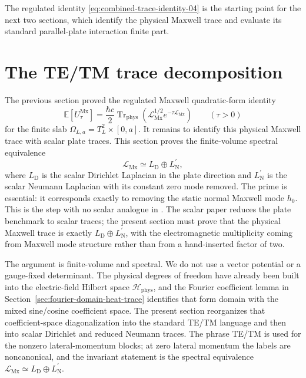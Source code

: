 \documentclass[11pt]{article}
\providecommand{\hbarc}{\hbar c}
\providecommand{\E}{\mathbb{E}}
\providecommand{\Trphys}{\operatorname{Tr}_{\mathrm{phys}}}
\providecommand{\paren}[1]{\left(#1\right)}
\providecommand{\OmegaLa}{\Omega_{L,a}}
\providecommand{\TtwoL}{T_L^2}
\providecommand{\Hphys}{\mathcal H_{\mathrm{phys}}}
\providecommand{\hzero}{h_0}
\providecommand{\LMx}{\mathcal L_{\mathrm{Mx}}}
\providecommand{\LD}{L_{\mathrm D}}
\providecommand{\LNp}{L_{\mathrm N}^{\prime}}
\providecommand{\UtauMx}{U_{\tau}^{\mathrm{Mx}}}
\numberwithin{equation}{section}
\begin{document}
\begin{remark}
\label{rem:remaining-after-riesz-gaussian}
The regulated identity \eqref{eq:combined-trace-identity-04} is the starting
point for the next two sections, which identify the physical Maxwell trace and
evaluate its standard parallel-plate interaction finite part.
\end{remark}
\section{The TE/TM trace decomposition}
\label{sec:te-tm-decomposition}

The previous section proved the regulated Maxwell quadratic-form identity
\begin{equation}
    \E[\UtauMx]
    =
    \frac{\hbarc}{2}
    \Trphys\paren{\LMx^{1/2}e^{-\tau\LMx}}
    \qquad (\tau>0)
    \label{eq:te-tm-starting-regulated-trace}
\end{equation}
for the finite slab \(\OmegaLa=\TtwoL\times[0,a]\).  It remains to identify
this physical Maxwell trace with scalar plate traces.  This section proves the
finite-volume spectral equivalence
\begin{equation}
    \LMx \simeq \LD\oplus \LNp,
    \label{eq:LMx-spectral-equivalence-LD-LNp-informal}
\end{equation}
where \(\LD\) is the scalar Dirichlet Laplacian in the plate direction and
\(\LNp\) is the scalar Neumann Laplacian with its constant zero mode removed.
The prime is essential: it corresponds exactly to removing the static normal
Maxwell mode \(\hzero\).
This is the step with no scalar analogue in \cite{KhanKhan2026Scalar}.  The
scalar paper reduces the plate benchmark to scalar traces; the present section
must prove that the physical Maxwell trace is exactly \(\LD\oplus\LNp\), with
the electromagnetic multiplicity coming from Maxwell mode structure rather than
from a hand-inserted factor of two.

The argument is finite-volume and spectral.  We do not use a vector potential
or a gauge-fixed determinant.  The physical degrees of freedom have already
been built into the electric-field Hilbert space \(\Hphys\), and the Fourier
coefficient lemma in Section~\ref{sec:fourier-domain-heat-trace} identifies
that form domain with the mixed sine/cosine coefficient space.  The present
section reorganizes that coefficient-space diagonalization into the standard
TE/TM language and then into scalar Dirichlet and reduced Neumann traces.
The phrase TE/TM is used for the nonzero lateral-momentum blocks; at zero
lateral momentum the labels are noncanonical, and the invariant statement is
the spectral equivalence \(\LMx\simeq \LD\oplus\LNp\).
\end{document}
